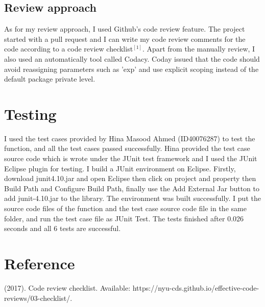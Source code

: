\documentclass[12pt]{extarticle}
\newcommand{\<}{\langle}
\renewcommand{\>}{\rangle}
\theoremstyle{definition}
\begin{document}
\subsection{Review approach}
As for my review approach, I used Github's code review feature. The project started with a pull request and I can write my code review comments for the code according to a code review checklist$^{[1]}$. Apart from the manually review, I also used an automatically tool called Codacy. Coday issued that the code should avoid reassigning parameters such as 'exp' and use explicit scoping instead of the default package private level.
\section{Testing}
\indent
I used the test cases provided by Hina Masood Ahmed (ID40076287) to test the function, and all the test cases passed successfully.
\newline
\indent
Hina provided the test case source code which is wrote under the JUnit test framework and I used the JUnit Eclipse plugin for testing.
\newline
\indent
I build a JUnit environment on Eclipse. Firstly, download junit4.10.jar and open Eclipse then click on project and property then Build Path and Configure Build Path, finally use the Add External Jar button to add junit-4.10.jar to the library. The environment was built successfully.
\newline
\indent
I put the source code files of the function and the test case source code file in the same folder, and run the test case file as JUnit Test. The tests finished after 0.026 seconds and all 6 tests are successful.
\section{Reference}

\noindent [1] (2017). Code review checklist. Available: https://nyu-cds.github.io/effective-code-reviews/03-checklist/.  
\end{document}
